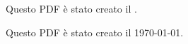 \documentclass[italian]{article}
\begin{document}
Questo PDF è stato creato il \DTMnow.

Questo PDF è stato creato il \today.
\end{document}
